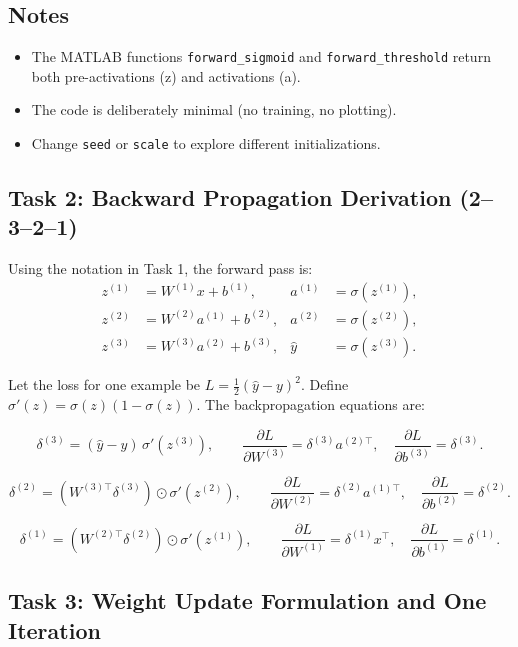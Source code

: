 \documentclass[11pt,a4paper]{article}
\begin{document}
\subsection*{Notes}
\begin{itemize}
  \item The MATLAB functions \texttt{forward\_sigmoid} and
        \texttt{forward\_threshold} return both pre-activations (z) and activations (a).
  \item The code is deliberately minimal (no training, no plotting).
  \item Change \texttt{seed} or \texttt{scale} to explore different initializations.
\end{itemize}


\subsection{Task 2: Backward Propagation Derivation (2--3--2--1)}

Using the notation in Task 1, the forward pass is:
\[
\begin{aligned}
z^{(1)} &= W^{(1)} x + b^{(1)}, & a^{(1)} &= \sigma(z^{(1)}),\\
z^{(2)} &= W^{(2)} a^{(1)} + b^{(2)}, & a^{(2)} &= \sigma(z^{(2)}),\\
z^{(3)} &= W^{(3)} a^{(2)} + b^{(3)}, & \hat{y} &= \sigma(z^{(3)}).
\end{aligned}
\]

Let the loss for one example be \(L=\tfrac{1}{2}(\hat{y}-y)^2\). Define
\(\sigma'(z)=\sigma(z)(1-\sigma(z))\). The backpropagation equations are:

\[
\delta^{(3)} = (\hat{y}-y)\,\sigma'(z^{(3)}),\qquad
\frac{\partial L}{\partial W^{(3)}} = \delta^{(3)} a^{(2)\top},\quad
\frac{\partial L}{\partial b^{(3)}} = \delta^{(3)}.
\]

\[
\delta^{(2)} = (W^{(3)\top}\delta^{(3)}) \odot \sigma'(z^{(2)}),
\qquad
\frac{\partial L}{\partial W^{(2)}} = \delta^{(2)} a^{(1)\top},\quad
\frac{\partial L}{\partial b^{(2)}} = \delta^{(2)}.
\]

\[
\delta^{(1)} = (W^{(2)\top}\delta^{(2)}) \odot \sigma'(z^{(1)}),
\qquad
\frac{\partial L}{\partial W^{(1)}} = \delta^{(1)} x^\top,\quad
\frac{\partial L}{\partial b^{(1)}} = \delta^{(1)}.
\]

\subsection{Task 3: Weight Update Formulation and One Iteration}
\end{document}
